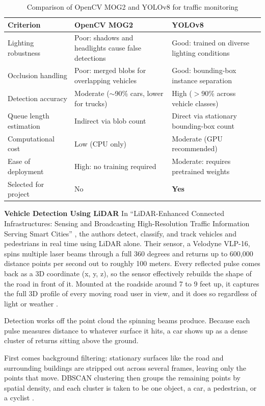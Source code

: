 ﻿\documentclass[11pt, a4paper]{report}
\begin{document}
\begin{table}[H]
\centering
\caption{Comparison of OpenCV MOG2 and YOLOv8 for traffic monitoring}
\label{tab:opencv_yolo}
\normalsize
\setlength{\tabcolsep}{7pt}
\begin{tabular}{p{3.9cm}p{4.5cm}p{4.5cm}}
\toprule
\textbf{Criterion} & \textbf{OpenCV MOG2} & \textbf{YOLOv8} \\
\midrule
Lighting robustness & Poor: shadows and headlights cause false detections & Good: trained on diverse lighting conditions \\
Occlusion handling & Poor: merged blobs for overlapping vehicles & Good: bounding-box instance separation \\
Detection accuracy & Moderate ($\sim$90\% cars, lower for trucks) & High ($>$90\% across vehicle classes) \\
Queue length estimation & Indirect via blob count & Direct via stationary bounding-box count \\
Computational cost & Low (CPU only) & Moderate (GPU recommended) \\
Ease of deployment & High: no training required & Moderate: requires pretrained weights \\
Selected for project & No & \textbf{Yes} \\
\bottomrule
\end{tabular}
\end{table}

\textbf{Vehicle Detection Using LiDAR}
In ``LiDAR-Enhanced Connected Infrastructures: Sensing and Broadcasting High-Resolution Traffic Information Serving Smart Cities'' \cite{lv2019lidar}, the authors detect, classify, and track vehicles and pedestrians in real time using LiDAR alone. Their sensor, a Velodyne VLP-16, spins multiple laser beams through a full 360 degrees and returns up to 600,000 distance points per second out to roughly 100 meters. Every reflected pulse comes back as a 3D coordinate (x, y, z), so the sensor effectively rebuilds the shape of the road in front of it. Mounted at the roadside around 7 to 9 feet up, it captures the full 3D profile of every moving road user in view, and it does so regardless of light or weather \cite{lv2019lidar}.

Detection works off the point cloud the spinning beams produce. Because each pulse measures distance to whatever surface it hits, a car shows up as a dense cluster of returns sitting above the ground.

First comes background filtering: stationary surfaces like the road and surrounding buildings are stripped out across several frames, leaving only the points that move. DBSCAN clustering then groups the remaining points by spatial density, and each cluster is taken to be one object, a car, a pedestrian, or a cyclist \cite{lv2019lidar}.
\end{document}
